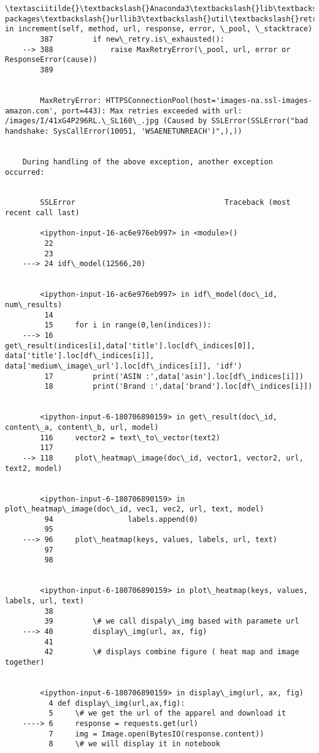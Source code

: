 \documentclass[11pt]{article}
\begin{document}
\begin{Verbatim}[commandchars=\\\{\}]
        \textasciitilde{}\textbackslash{}Anaconda3\textbackslash{}lib\textbackslash{}site-packages\textbackslash{}urllib3\textbackslash{}util\textbackslash{}retry.py in increment(self, method, url, response, error, \_pool, \_stacktrace)
        387         if new\_retry.is\_exhausted():
    --> 388             raise MaxRetryError(\_pool, url, error or ResponseError(cause))
        389 
    

        MaxRetryError: HTTPSConnectionPool(host='images-na.ssl-images-amazon.com', port=443): Max retries exceeded with url: /images/I/41xG4P296RL.\_SL160\_.jpg (Caused by SSLError(SSLError("bad handshake: SysCallError(10051, 'WSAENETUNREACH')",),))

        
    During handling of the above exception, another exception occurred:
    

        SSLError                                  Traceback (most recent call last)

        <ipython-input-16-ac6e976eb997> in <module>()
         22 
         23 
    ---> 24 idf\_model(12566,20)
    

        <ipython-input-16-ac6e976eb997> in idf\_model(doc\_id, num\_results)
         14 
         15     for i in range(0,len(indices)):
    ---> 16         get\_result(indices[i],data['title'].loc[df\_indices[0]], data['title'].loc[df\_indices[i]], data['medium\_image\_url'].loc[df\_indices[i]], 'idf')
         17         print('ASIN :',data['asin'].loc[df\_indices[i]])
         18         print('Brand :',data['brand'].loc[df\_indices[i]])
    

        <ipython-input-6-180706890159> in get\_result(doc\_id, content\_a, content\_b, url, model)
        116     vector2 = text\_to\_vector(text2)
        117 
    --> 118     plot\_heatmap\_image(doc\_id, vector1, vector2, url, text2, model)
    

        <ipython-input-6-180706890159> in plot\_heatmap\_image(doc\_id, vec1, vec2, url, text, model)
         94                 labels.append(0)
         95 
    ---> 96     plot\_heatmap(keys, values, labels, url, text)
         97 
         98 
    

        <ipython-input-6-180706890159> in plot\_heatmap(keys, values, labels, url, text)
         38 
         39         \# we call dispaly\_img based with paramete url
    ---> 40         display\_img(url, ax, fig)
         41 
         42         \# displays combine figure ( heat map and image together)
    

        <ipython-input-6-180706890159> in display\_img(url, ax, fig)
          4 def display\_img(url,ax,fig):
          5     \# we get the url of the apparel and download it
    ----> 6     response = requests.get(url)
          7     img = Image.open(BytesIO(response.content))
          8     \# we will display it in notebook
    


\end{Verbatim}
\end{document}
